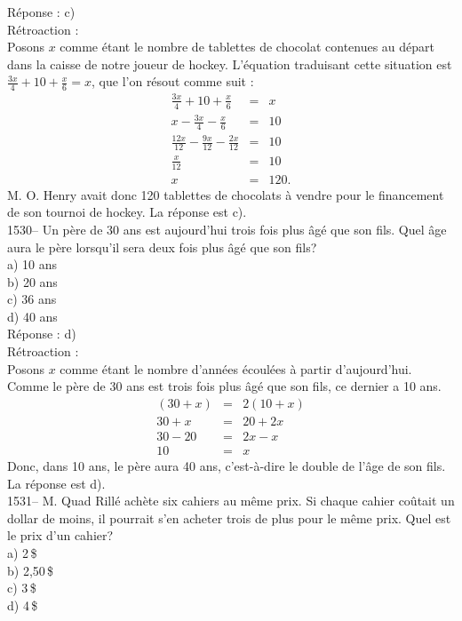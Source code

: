 R\'eponse : c)\\

R\'etroaction :\\
Posons $x$ comme \'etant le nombre de tablettes de chocolat
contenues au d\'epart dans la caisse de notre joueur de hockey.
L'\'equation traduisant cette situation est
$\frac{3x}{4}+10+\frac{x}{6}=x$, que l'on r\'esout comme suit :
\begin{eqnarray*}
\frac{3x}{4}+10+\frac{x}{6}&=&x \\[3mm] x-\frac{3x}{4}-\frac{x}{6}&=&10
\\[3mm]
\frac{12x}{12}-\frac{9x}{12}-\frac{2x}{12}&=&10 \\[3mm] \frac{x}{12}&=&10
\\[3mm]
x&=&120.
\end{eqnarray*}
M. O. Henry avait donc 120 tablettes de chocolats \`a vendre pour le
financement de son tournoi de hockey. La r\'eponse est c).\\

1530-- Un p\`ere de 30 ans est aujourd'hui trois fois plus \^ag\'e
que son fils. Quel
\^age aura le p\`ere lorsqu'il sera deux fois plus \^ag\'e que son fils?\\
a) 10 ans\\
b) 20 ans\\
c) 36 ans\\
d) 40 ans\\

R\'eponse : d)\\

R\'etroaction :\\
Posons $x$ comme \'etant le nombre d'ann\'ees \'ecoul\'ees \`a
partir d'aujourd'hui. Comme le p\`ere de 30 ans est trois fois plus
\^ag\'e que son fils, ce dernier a 10 ans.
\begin{eqnarray*}
(30+x)&=&2(10+x) \\ 30+x&=&20+2x \\ 30-20&=&2x-x \\ 10&=&x
\end{eqnarray*}
Donc, dans 10 ans, le p\`ere aura 40 ans,  c'est-\`a-dire le double
de l'\^age de son fils. La r\'eponse est d).\\

1531-- M. Quad Rill\'e ach\`ete six cahiers au m\^eme prix. Si chaque
cahier co\^utait un dollar de moins, il pourrait s'en acheter trois
de plus pour le
m\^eme prix. Quel est le prix d'un cahier?\\
a) 2\,\$\\
b) 2,50\,\$\\
c) 3\,\$\\
d) 4\,\$\\

